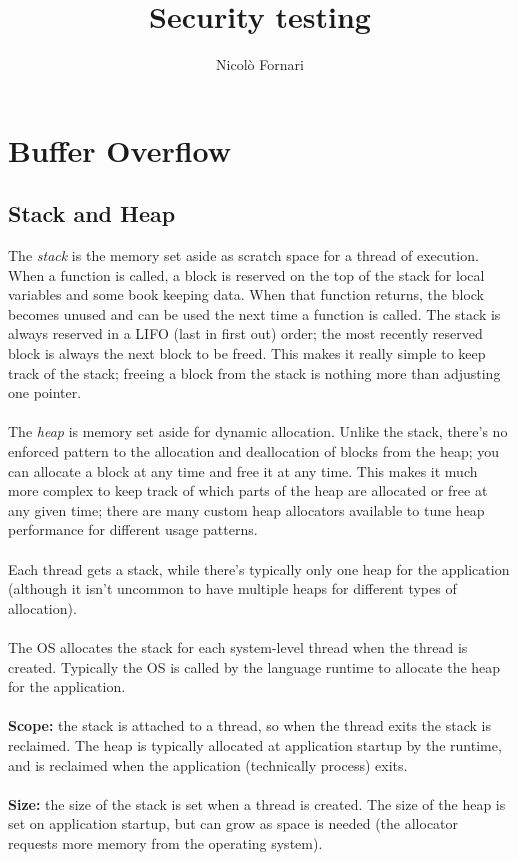 \documentclass[10pt,a4paper]{article}
\author{Nicolò Fornari}
\title{Security testing}
\begin{document}
\maketitle
\section{Buffer Overflow}
\subsection{Stack and Heap}
The \emph{stack} is the memory set aside as scratch space for a thread of execution. When a function is called, a block is reserved on the top of the stack for local variables and some book keeping data. When that function returns, the block becomes unused and can be used the next time a function is called. The stack is always reserved in a LIFO (last in first out) order; the most recently reserved block is always the next block to be freed. This makes it really simple to keep track of the stack; freeing a block from the stack is nothing more than adjusting one pointer.\\\\
The \emph{heap} is memory set aside for dynamic allocation. Unlike the stack, there's no enforced pattern to the allocation and deallocation of blocks from the heap; you can allocate a block at any time and free it at any time. This makes it much more complex to keep track of which parts of the heap are allocated or free at any given time; there are many custom heap allocators available to tune heap performance for different usage patterns.\\\\
Each thread gets a stack, while there's typically only one heap for the application (although it isn't uncommon to have multiple heaps for different types of allocation).\\\\
The OS allocates the stack for each system-level thread when the thread is created. Typically the OS is called by the language runtime to allocate the heap for the application.\\\\
\textbf{Scope:} the stack is attached to a thread, so when the thread exits the stack is reclaimed. The heap is typically allocated at application startup by the runtime, and is reclaimed when the application (technically process) exits.\\\\
\textbf{Size:} the size of the stack is set when a thread is created. The size of the heap is set on application startup, but can grow as space is needed (the allocator requests more memory from the operating system).\\\\
\end{document}
